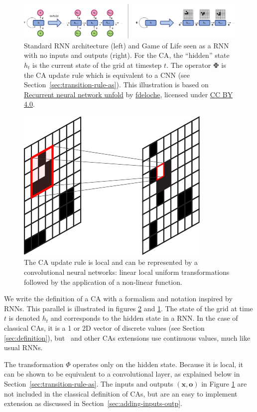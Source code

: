 \begin{figure}[htbp]
  \centering
  \includegraphics[width=\linewidth]{figures/rnn_and_gol.pdf}
  \caption{\label{fig:standard_rnn} Standard RNN architecture (left) and Game of
    Life seen as a RNN with no inputs and outputs (right). For the \ac{CA}, the
    ``hidden'' state $h_t$ is the current state of the grid at timestep $t$. The
    operator $\boldsymbol{\Phi}$ is the \ac{CA} update rule which is
    equivalent to a \ac{CNN} (see Section~\ref{sec:transition-rule-as}). This
    illustration is based on
    \href{https://commons.wikimedia.org/wiki/File:Recurrent_neural_network_unfold.svg}{Recurrent
      neural network unfold} by
    \href{https://commons.wikimedia.org/wiki/User:Ixnay}{fdeloche}, licensed
    under \href{https://creativecommons.org/licenses/by-sa/4.0/}{CC BY 4.0}.}
\end{figure}


\begin{figure}[htbp]
  \centering
  \includegraphics[width=.3\linewidth]{figures/ca_cnn}
  \caption{\label{fig:ca_cnn}The CA update rule is local and can be represented
    by a convolutional neural networks: linear local uniform transformations
    followed by the application of a non-linear function.}
\end{figure}

We write the definition of a \ac{CA} with a formalism and notation inspired by \acp{RNN}. This parallel is illustrated in figures \ref{fig:ca_cnn} and
\ref{fig:standard_rnn}. The state of the grid at time $t$ is denoted $h_t$ and
corresponds to the hidden state in a RNN\@. In the case of classical \acp{CA},
it is a 1 or 2D vector of discrete values (see Section \ref{sec:definition}),
but~\parencite{mordvintsevGrowingNeuralCellular2020} and other \acp{CA}
extensions use continuous values, much like usual \acp{RNN}.

The transformation $\Phi$ operates only on the hidden state. Because it is local,
it can be shown to be equivalent to a convolutional layer, as explained below in
Section~\ref{sec:transition-rule-as}. The inputs and outputs
$(\mathbf{x}, \mathbf{o})$ in Figure \ref{fig:standard_rnn} are not included
in the classical definition of \acp{CA}, but are an easy to implement extension as
discussed in Section~\ref{sec:adding-inputs-outp}.


